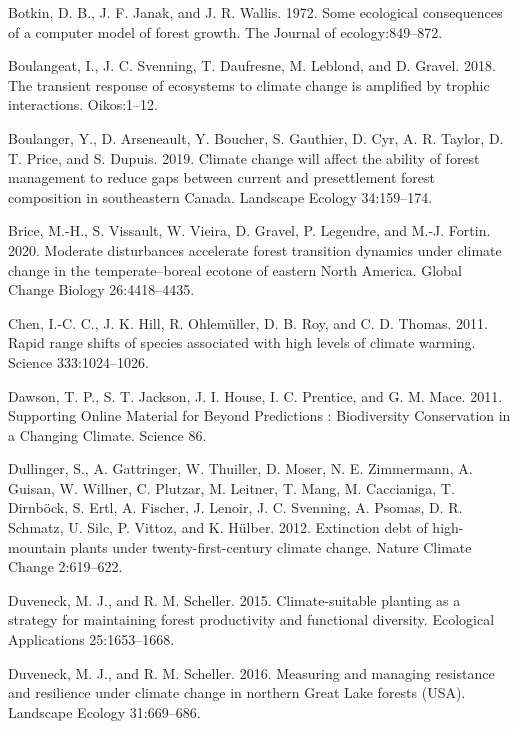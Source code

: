 \documentclass[12pt]{article}
\newlength{\cslhangindent}
\newenvironment{cslreferences}%
  {\setlength{\parindent}{0pt}%
  \everypar{\setlength{\hangindent}{\cslhangindent}}\ignorespaces}%
  {\par}
\begin{document}
\begin{cslreferences}
\leavevmode\hypertarget{ref-Botkin1972}{}%
Botkin, D. B., J. F. Janak, and J. R. Wallis. 1972. Some ecological
consequences of a computer model of forest growth. The Journal of
ecology:849--872.

\leavevmode\hypertarget{ref-Boulangeat2018}{}%
Boulangeat, I., J. C. Svenning, T. Daufresne, M. Leblond, and D. Gravel.
2018. The transient response of ecosystems to climate change is
amplified by trophic interactions. Oikos:1--12.

\leavevmode\hypertarget{ref-Boulanger2019}{}%
Boulanger, Y., D. Arseneault, Y. Boucher, S. Gauthier, D. Cyr, A. R.
Taylor, D. T. Price, and S. Dupuis. 2019. Climate change will affect the
ability of forest management to reduce gaps between current and
presettlement forest composition in southeastern Canada. Landscape
Ecology 34:159--174.

\leavevmode\hypertarget{ref-Brice2020}{}%
Brice, M.-H., S. Vissault, W. Vieira, D. Gravel, P. Legendre, and M.-J.
Fortin. 2020. Moderate disturbances accelerate forest transition
dynamics under climate change in the temperate--boreal ecotone of
eastern North America. Global Change Biology 26:4418--4435.

\leavevmode\hypertarget{ref-Chen2011}{}%
Chen, I.-C. C., J. K. Hill, R. Ohlemüller, D. B. Roy, and C. D. Thomas.
2011. Rapid range shifts of species associated with high levels of
climate warming. Science 333:1024--1026.

\leavevmode\hypertarget{ref-Dawson2011}{}%
Dawson, T. P., S. T. Jackson, J. I. House, I. C. Prentice, and G. M.
Mace. 2011. Supporting Online Material for Beyond Predictions :
Biodiversity Conservation in a Changing Climate. Science 86.

\leavevmode\hypertarget{ref-Dullinger2012}{}%
Dullinger, S., A. Gattringer, W. Thuiller, D. Moser, N. E. Zimmermann,
A. Guisan, W. Willner, C. Plutzar, M. Leitner, T. Mang, M. Caccianiga,
T. Dirnböck, S. Ertl, A. Fischer, J. Lenoir, J. C. Svenning, A. Psomas,
D. R. Schmatz, U. Silc, P. Vittoz, and K. Hülber. 2012. Extinction debt
of high-mountain plants under twenty-first-century climate change.
Nature Climate Change 2:619--622.

\leavevmode\hypertarget{ref-Duveneck2015}{}%
Duveneck, M. J., and R. M. Scheller. 2015. Climate-suitable planting as
a strategy for maintaining forest productivity and functional diversity.
Ecological Applications 25:1653--1668.

\leavevmode\hypertarget{ref-Duveneck2016}{}%
Duveneck, M. J., and R. M. Scheller. 2016. Measuring and managing
resistance and resilience under climate change in northern Great Lake
forests (USA). Landscape Ecology 31:669--686.


\end{cslreferences}
\end{document}

